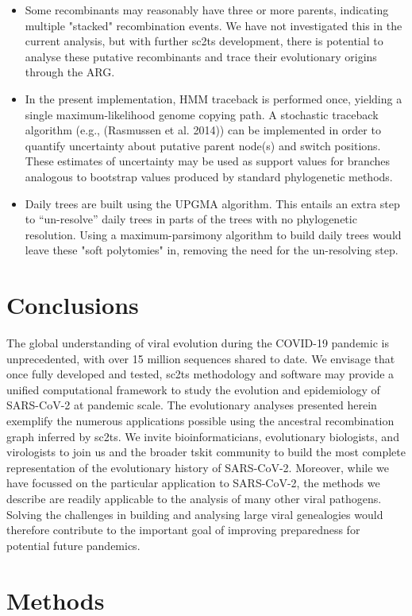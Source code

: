 \documentclass{article}
\begin{document}
\begin{itemize}
\item Some recombinants may reasonably have three or more parents, indicating multiple "stacked" recombination events. We have not investigated this in the current analysis, but with further sc2ts development, there is potential to analyse these putative recombinants and trace their evolutionary origins through the ARG.
\item In the present implementation, HMM traceback is performed once, yielding a single maximum-likelihood genome copying path. A stochastic traceback algorithm (e.g., (Rasmussen et al. 2014)) can be implemented in order to quantify uncertainty about putative parent node(s) and switch positions. These estimates of uncertainty may be used as support values for branches analogous to bootstrap values produced by standard phylogenetic methods.
\item Daily trees are built using the UPGMA algorithm. This entails an extra step to ``un-resolve'' daily trees in parts of the trees with no phylogenetic resolution. Using a maximum-parsimony algorithm to build daily trees would leave these "soft polytomies" in, removing the need for the un-resolving step.
\end{itemize}

\section{Conclusions}
The global understanding of viral evolution during the COVID-19 pandemic is
unprecedented, with over 15 million sequences shared to date. We envisage that
once fully developed and tested, sc2ts methodology and software may provide a
unified computational framework to study the evolution and epidemiology of
SARS-CoV-2 at pandemic scale. The evolutionary analyses presented herein
exemplify the numerous applications possible using the ancestral recombination
graph inferred by sc2ts. We invite bioinformaticians, evolutionary biologists,
and virologists to join us and the broader tskit community to build the most
complete representation of the evolutionary history of SARS-CoV-2. Moreover,
while we have focussed on the particular application to SARS-CoV-2, the methods
we describe are readily applicable to the analysis of many other viral
pathogens. Solving the challenges in building and analysing large viral
genealogies would therefore contribute to the important goal of improving
preparedness for potential future pandemics.

\section{Methods}
\end{document}
